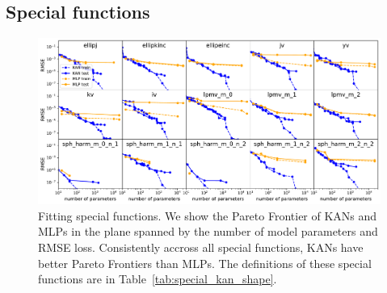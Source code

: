 \documentclass{article}
\numberwithin{equation}{section}
\numberwithin{figure}{section}
\begin{document}




\subsection{Special functions}\label{subsec:special}


\begin{figure}[t]
    \centering
    \includegraphics[width=1\linewidth]{figs/special_pf.pdf}
    \caption{Fitting special functions. We show the Pareto Frontier of KANs and MLPs in the plane spanned by the number of model parameters and RMSE loss. Consistently accross all special functions, KANs have better Pareto Frontiers than MLPs. The definitions of these special functions are in Table~\ref{tab:special_kan_shape}.}
    \label{fig:special_pf}
\end{figure}
\end{document}
